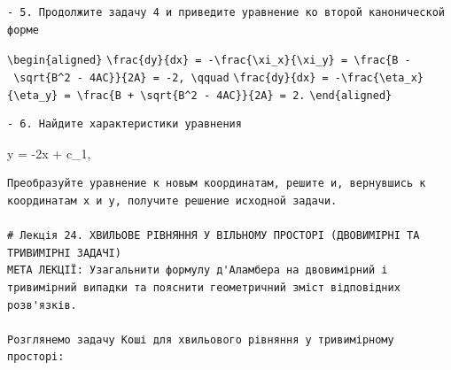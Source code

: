 \documentclass[
  ukrainian,
]{article}
\begin{document}
\begin{verbatim}
- 5. Продолжите задачу 4 и приведите уравнение ко второй канонической форме
\end{verbatim}

\texttt{\textbackslash{}begin\{aligned\}}
\texttt{\textbackslash{}frac\{dy\}\{dx\}\ =\ -\textbackslash{}frac\{\textbackslash{}xi\_x\}\{\textbackslash{}xi\_y\}\ =\ \textbackslash{}frac\{B\ -\ \textbackslash{}sqrt\{B\^{}2\ -\ 4AC\}\}\{2A\}\ =\ -2,\ \textbackslash{}qquad}
\texttt{\textbackslash{}frac\{dy\}\{dx\}\ =\ -\textbackslash{}frac\{\textbackslash{}eta\_x\}\{\textbackslash{}eta\_y\}\ =\ \textbackslash{}frac\{B\ +\ \textbackslash{}sqrt\{B\^{}2\ -\ 4AC\}\}\{2A\}\ =\ 2.}
\texttt{\textbackslash{}end\{aligned\}}

\begin{verbatim}
- 6. Найдите характеристики уравнения
\end{verbatim}

y = -2x + c\_1,

\begin{verbatim}
Преобразуйте уравнение к новым координатам, решите и, вернувшись к координатам x и y, получите решение исходной задачи.

# Лекція 24. ХВИЛЬОВЕ РІВНЯННЯ У ВІЛЬНОМУ ПРОСТОРІ (ДВОВИМІРНІ ТА ТРИВИМІРНІ ЗАДАЧІ)
МЕТА ЛЕКЦІЇ: Узагальнити формулу д'Аламбера на двовимірний і тривимірний випадки та пояснити геометричний зміст відповідних розв'язків.

Розглянемо задачу Коші для хвильового рівняння у тривимірному просторі:
\end{verbatim}
\end{document}
